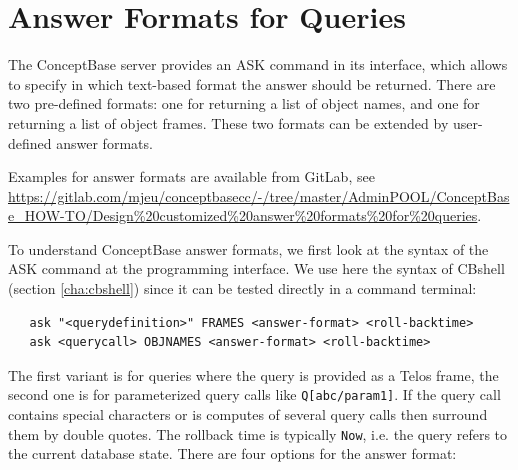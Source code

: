 \chapter{Answer Formats for Queries}
\label{sec:answerformat}

The ConceptBase server provides an ASK command in its interface, which
allows to specify in which text-based format the answer should be returned. There
are two pre-defined formats: one for returning a list of object names,
and one for returning a list of object frames. These two formats can
be extended by user-defined answer formats.


Examples for answer formats are available from GitLab,
see \url{https://gitlab.com/mjeu/conceptbasecc/-/tree/master/AdminPOOL/ConceptBase_HOW-TO/Design%20customized%20answer%20formats%20for%20queries}.

To understand ConceptBase answer formats, we first look at
the syntax of the ASK command at the programming interface. We use here the syntax
of CBshell (section \ref{cha:cbshell}) since it can be tested directly in a command terminal:

\begin{verbatim}
   ask "<querydefinition>" FRAMES <answer-format> <roll-backtime>
   ask <querycall> OBJNAMES <answer-format> <roll-backtime>
\end{verbatim}

The first variant is for queries where the query is provided
as a Telos frame, the second one
is for parameterized query calls like {\tt Q[abc/param1]}.
If the query call contains special characters or is computes of several query calls
then surround them by double quotes. The rollback time is
typically {\tt Now}, i.e. the query refers to the current database state.
There are four options for the answer format:

